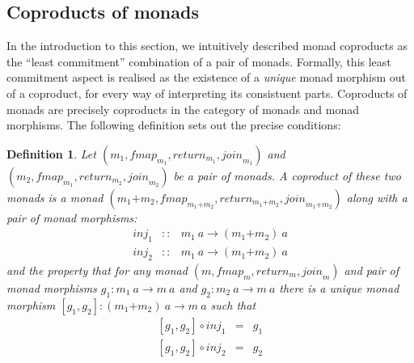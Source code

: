 \documentclass{jfp1}
\newtheorem{definition}{Definition}
\begin{document}
\subsection{Coproducts of monads}
\label{sec:coproducts-of-monads}

\newcommand{\cprd}[2]{#1\mathord{+}#2}

In the introduction to this section, we intuitively described monad
coproducts as the ``least commitment'' combination of a pair of
monads. Formally, this least commitment aspect is realised as the
existence of a \emph{unique} monad morphism out of a coproduct, for
every way of interpreting its consistuent parts. Coproducts of monads
are precisely coproducts in the category of monads and monad
morphisms. The following definition sets out the precise conditions:
\begin{definition}\label{defn:coproducts}
  Let $(m_1, \mathit{fmap}_{m_1}, \mathit{return}_{m_1}, \mathit{join}_{m_1})$ and $(m_2,
  \mathit{fmap}_{m_1}, \mathit{return}_{m_2}, \mathit{join}_{m_2})$ be a pair of monads. A \emph{coproduct} of these two monads is a
  monad $(\cprd{m_1}{m_2}, \mathit{fmap}_{\cprd{m_1}{m_2}}, \mathit{return}_{\cprd{m_1}{m_2}},
  \mathit{join}_{\cprd{m_1}{m_2}})$ along with a pair of monad morphisms:
  \begin{displaymath}
    \begin{array}{rcl}
      \mathit{inj}_1 & :: & m_1~a \to (\cprd{m_1}{m_2})~a \\
      \mathit{inj}_2 & :: & m_1~a \to (\cprd{m_1}{m_2})~a
    \end{array}
  \end{displaymath}
  and the property that for any monad $(m,\mathit{fmap}_m,
  \mathit{return}_m, \mathit{join}_m)$ and pair of monad morphisms
  $g_1 : m_1~a \to m~a$ and $g_2 : m_2~a \to m~a$ there is a
  \emph{unique} monad morphism $[g_1,g_2] : (\cprd{m_1}{m_2})~a \to
  m~a$ such that
  \begin{displaymath}
    \begin{array}{rcl}
      {}[g_1,g_2] \circ \mathit{inj}_1 & = & g_1 \\
      {}[g_1,g_2] \circ \mathit{inj}_2 & = & g_2
    \end{array}
  \end{displaymath}
\end{definition}
\end{document}
